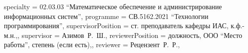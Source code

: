 {    specialty          = {02.03.03 \enquote{Математическое обеспечение и администрирование информационных систем}},
    programme          = {СВ.5162.2021 \enquote{Технологии программирования}},
    supervisorPosition = {ст. преподаватель кафедры ИАС, к.ф.-м.н.,},
    supervisor         = {Азимов~Р.~Ш.},
    reviewerPosition   = {должность, ООО \enquote{Место работы}, степень (если есть),},
    reviewer           = {Рецензент~Р.~Р.},
}

